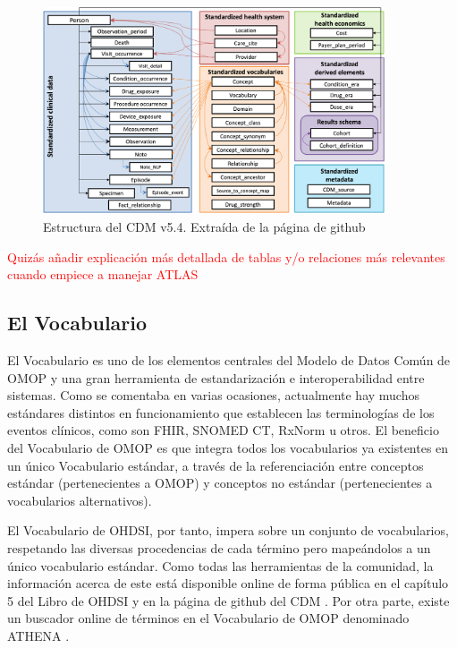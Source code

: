 \begin{figure}[H]
    \centering
    \includegraphics[width=0.90\textwidth]{figures/cdm54.png}
     \caption{Estructura del CDM v5.4. Extraída de la página de github \cite{gitPagesCMD}}
    \label{fig:cdm54}
\end{figure}

\textcolor{red}{Quizás añadir explicación más detallada de tablas y/o relaciones más relevantes cuando empiece a manejar ATLAS}

\subsection{El Vocabulario}\label{subsec:05vocab}

El Vocabulario es uno de los elementos centrales del Modelo de Datos Común de OMOP y una gran herramienta de estandarización e interoperabilidad entre sistemas. Como se comentaba en varias ocasiones, actualmente hay muchos estándares distintos en funcionamiento que establecen las terminologías de los eventos clínicos, como son FHIR, SNOMED CT, RxNorm u otros. El beneficio del Vocabulario de OMOP es que integra todos los vocabularios ya existentes en un único Vocabulario estándar, a través de la referenciación entre conceptos estándar (pertenecientes a OMOP) y conceptos no estándar (pertenecientes a vocabularios alternativos).

El Vocabulario de OHDSI, por tanto, impera sobre un conjunto de vocabularios, respetando las diversas procedencias de cada término pero mapeándolos a un único vocabulario estándar.  Como todas las herramientas de la comunidad, la información acerca de este está disponible online de forma pública en el capítulo 5 del Libro de OHDSI \cite{OHDSIbook} y en la página de github del CDM \cite{gitPagesCMD}. Por otra parte, existe un buscador online de términos en el Vocabulario de OMOP denominado ATHENA \cite{ATHENAweb}. 

